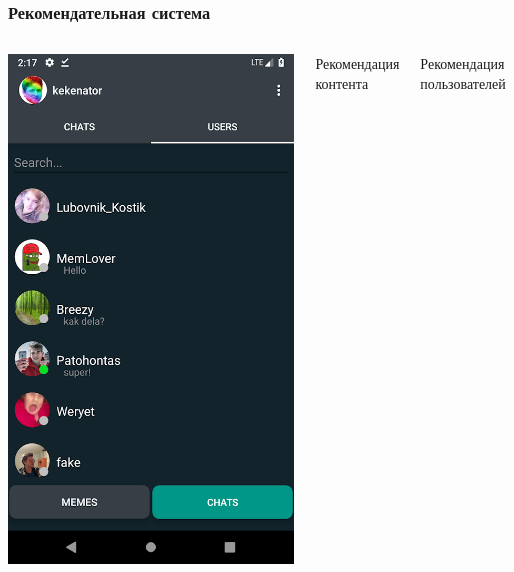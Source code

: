 \documentclass[xetex,mathserif,serif, xcolor=table]{beamer}
\begin{document}
	\begin{frame}
		\frametitle{Рекомендательная система}
		     \begin{columns}[t]
                    \begin{itemize}
                        \includegraphics[scale=0.179]{images/chats.png}
        			\end{itemize}
                    \item Рекомендация контента
        		    \item Рекомендация пользователей
            \end{columns}
	\end{frame}	
	
\end{document}

